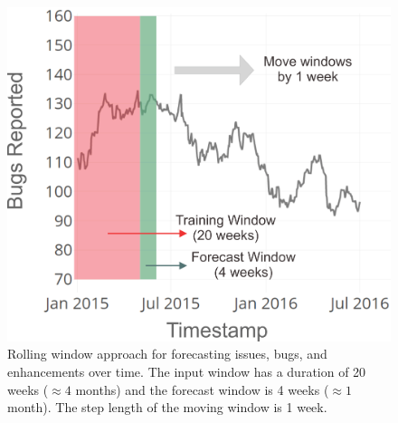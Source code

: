 \begin{figure}
	\centering
	\includegraphics[width=0.7\linewidth]{images/rolling.png}
	\caption{Rolling window approach for forecasting issues, bugs, and enhancements over time. The input window has a duration of 20 weeks ($\approx 4$ months) and the forecast window is 4 weeks ($\approx 1$ month). The step length of the moving window is 1 week.}
	\label{fig:rolling_window}
\end{figure}
